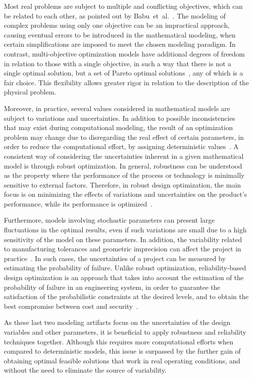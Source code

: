 \documentclass[final,5p,times,twocolumn,numbers]{elsarticle}
\begin{document}
Most real problems are subject to multiple and conflicting objectives, which can be related to each other, as pointed out by Babu~et~al.~\cite{bib:babu2005}. The modeling of complex problems using only one objective can be an impractical approach, causing eventual errors to be introduced in the mathematical modeling, when certain simplifications are imposed to meet the chosen modeling paradigm. In contrast, multi-objective optimization models have additional degrees of freedom in relation to those with a single objective, in such a way that there is not a single optimal solution, but a set of Pareto optimal solutions~\cite{bib:collette2004}, any of which is a fair choice. This flexibility allows greater rigor in relation to the description of the physical problem.

Moreover, in practice, several values considered in mathematical models are subject to variations and uncertainties. In addition to possible inconsistencies that may exist during computational modeling, the result of an optimization problem may change due to disregarding the real effect of certain parameters, in order to reduce the computational effort, by assigning deterministic values~\cite{bib:jurecka2007}. A consistent way of considering the uncertainties inherent in a given mathematical model is through robust optimization. In general, robustness can be understood as the property where the performance of the process or technology is minimally sensitive to external factors. Therefore, in robust design optimization, the main focus is on minimizing the effects of variations and uncertainties on the product's performance, while its performance is optimized~\cite{bib:taguchi1999}.

Furthermore, models involving stochastic parameters can present large fluctuations in the optimal results, even if such variations are small due to a high sensitivity of the model on these parameters. In addition, the variability related to manufacturing tolerances and geometric imprecision can affect the project in practice~\cite{bib:cursi2015}. In such cases, the uncertainties of a project can be measured by estimating the probability of failure. Unlike robust optimization, reliability-based design optimization is an approach that takes into account the estimation of the probability of failure in an engineering system, in order to guarantee the satisfaction of the probabilistic constraints at the desired levels, and to obtain the best compromise between cost and security~\cite{bib:haldar2000}.

As these last two modeling artifacts focus on the uncertainties of the design variables and other parameters, it is beneficial to apply robustness and reliability techniques together. Although this requires more computational efforts when compared to deterministic models, this issue is surpassed by the further gain of obtaining optimal feasible solutions that work in real operating conditions, and without the need to eliminate the source of variability.
\end{document}
